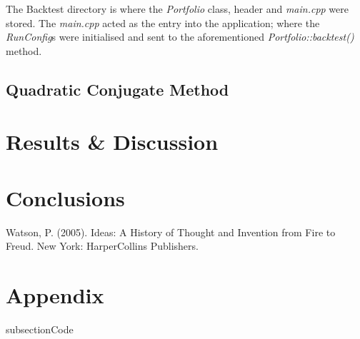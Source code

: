 \documentclass{article}
\begin{document}
The Backtest directory is where the \textit{Portfolio} class, header and \textit{main.cpp} were stored. The \textit{main.cpp} acted as the entry into the application; where the \textit{RunConfig}s were initialised and sent to the aforementioned \textit{Portfolio::backtest()} method.



\subsection{Quadratic Conjugate Method}
\label{sec:qcm}


\section{Results \& Discussion}
\label{sec:results}


\section{Conclusions}
\label{sec:concs}



\begin{thebibliography}{}
\label{sec:thebibliography}
	 Watson, P. (2005). Ideas: A History of Thought and Invention from Fire to Freud. New York: HarperCollins Publishers.
	
	
\end{thebibliography} 



\section{Appendix} 
\label{sec:appendix}

subsection{Code} 
\label{sec:code}
\end{document}
